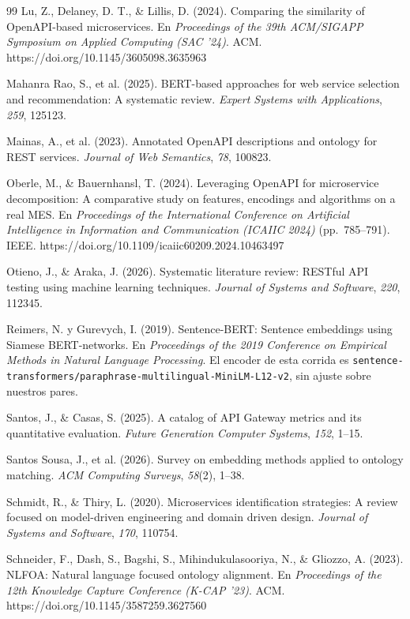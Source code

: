 \begin{thebibliography}{99}
Lu, Z., Delaney, D. T., \& Lillis, D. (2024).
Comparing the similarity of OpenAPI-based microservices.
En \textit{Proceedings of the 39th ACM/SIGAPP Symposium on Applied Computing (SAC '24)}. ACM.
https://doi.org/10.1145/3605098.3635963

Mahanra Rao, S., et al. (2025).
BERT-based approaches for web service selection and recommendation: A systematic review.
\textit{Expert Systems with Applications}, \textit{259}, 125123.

Mainas, A., et al. (2023).
Annotated OpenAPI descriptions and ontology for REST services.
\textit{Journal of Web Semantics}, \textit{78}, 100823.

Oberle, M., \& Bauernhansl, T. (2024).
Leveraging OpenAPI for microservice decomposition: A comparative study on features, encodings and algorithms on a real MES.
En \textit{Proceedings of the International Conference on Artificial Intelligence in Information and Communication (ICAIIC 2024)} (pp.~785--791). IEEE.
https://doi.org/10.1109/icaiic60209.2024.10463497

Otieno, J., \& Araka, J. (2026).
Systematic literature review: RESTful API testing using machine learning techniques.
\textit{Journal of Systems and Software}, \textit{220}, 112345.

Reimers, N. y Gurevych, I. (2019).
Sentence-BERT: Sentence embeddings using Siamese BERT-networks.
En \textit{Proceedings of the 2019 Conference on Empirical Methods in Natural Language Processing}.
El encoder de esta corrida es \texttt{sentence-transformers/paraphrase-multilingual-MiniLM-L12-v2}, sin ajuste sobre nuestros pares.

Santos, J., \& Casas, S. (2025).
A catalog of API Gateway metrics and its quantitative evaluation.
\textit{Future Generation Computer Systems}, \textit{152}, 1--15.

Santos Sousa, J., et al. (2026).
Survey on embedding methods applied to ontology matching.
\textit{ACM Computing Surveys}, \textit{58}(2), 1--38.

Schmidt, R., \& Thiry, L. (2020).
Microservices identification strategies: A review focused on model-driven engineering and domain driven design.
\textit{Journal of Systems and Software}, \textit{170}, 110754.

Schneider, F., Dash, S., Bagshi, S., Mihindukulasooriya, N., \& Gliozzo, A. (2023).
NLFOA: Natural language focused ontology alignment.
En \textit{Proceedings of the 12th Knowledge Capture Conference (K-CAP '23)}. ACM.
https://doi.org/10.1145/3587259.3627560


\end{thebibliography}
